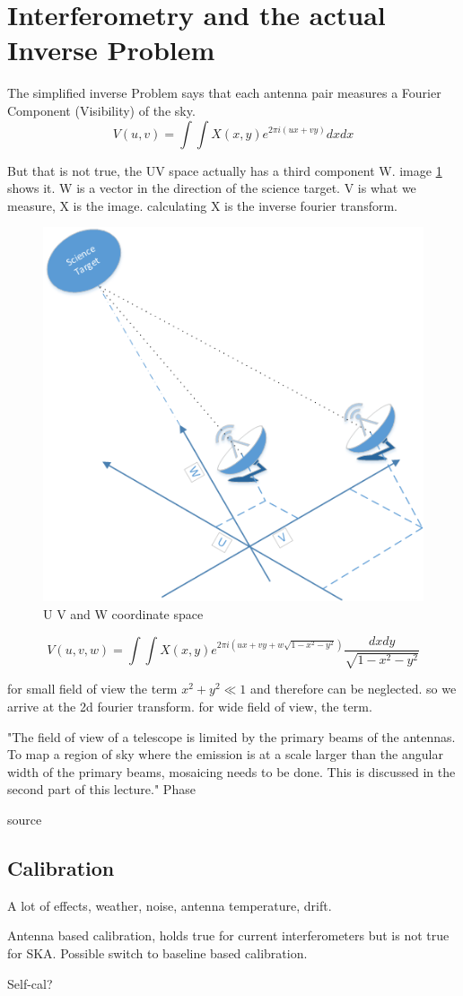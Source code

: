 \section{Interferometry and the actual Inverse Problem} \label{radio}

The simplified inverse Problem says that each antenna pair measures a Fourier Component (Visibility) of the sky. 
\begin{equation}\label{radio:eq:2dft}
V(u, v) = \int\int X(x, y) e^{2 \pi i (ux+vy)} dx dx
\end{equation}

But that is not true, the UV space actually has a third component W. image \ref{radio:uvw} shows it. W is a vector in the direction of the science target.
V is what we measure, X is the image. calculating X is the inverse fourier transform.

\begin{figure}[h!] 
	\centering
	\includegraphics[width=0.6\linewidth]{./chapters/03.radio/uvw.png}
	\caption{U V and W coordinate space}
	\label{radio:uvw}
\end{figure}

\begin{equation}\label{radio:eq:ft}
V(u, v, w) = \int\int X(x, y) e^{2 \pi i (ux+vy+ w\sqrt{1 - x^2 - y ^2})} \frac{dx dy}{\sqrt{1 - x^2 - y ^2}}
\end{equation}

for small field of view the term  $x^2 + y^2 \ll 1$ and therefore can be neglected. so we arrive at the 2d fourier transform. for wide field of view, the term.

"The field of view of a telescope is limited by the primary beams of the antennas. To map a region of sky where the emission is at a scale larger than the angular width of the primary beams, mosaicing needs to be done. This is discussed in the second part of this lecture."
Phase 

source \cite{lfraSchool}


\subsection{Calibration}
A lot of effects, weather, noise, antenna temperature, drift.

Antenna based calibration, holds true for current interferometers but is not true for SKA. Possible switch to baseline based calibration.

Self-cal?
